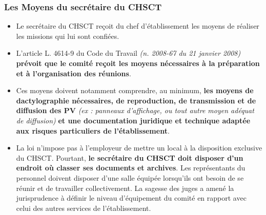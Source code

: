 \documentclass{beamer}
\begin{document}
\begin{frame}
\frametitle{Les Moyens du secrétaire du CHSCT}

\begin{itemize}
\item Le secrétaire du CHSCT reçoit du chef d’établissement les moyens de réaliser les missions qui lui sont confiées. 

\item L’article L. 4614-9 du Code du Travail \textit{(n. 2008-67 du 21 janvier 2008)} \textbf{prévoit que le comité reçoit les moyens nécessaires à la préparation et à l'organisation des réunions}. 

\item Ces moyens doivent notamment comprendre, au minimum, \textbf{les moyens de dactylographie nécessaires, de reproduction, de transmission et de diffusion des PV} \textit{(ex : panneaux d'affichage, ou tout autre moyen adéquat de diffusion)} \textbf{et une documentation juridique et technique adaptée aux risques particuliers de l'établissement}.

\item La loi n’impose pas à l’employeur de mettre un local à la disposition exclusive du CHSCT. Pourtant, \textbf{le secrétaire du CHSCT doit disposer d’un endroit où classer ses documents et archives}. Les représentants du personnel doivent disposer d’une salle équipée lorsqu’ils ont besoin de se réunir et de travailler collectivement. La sagesse des juges a amené la jurisprudence à définir le niveau d’équipement du comité en rapport avec celui des autres services de l’établissement.
\end{itemize}
\end{frame}
\end{document}
